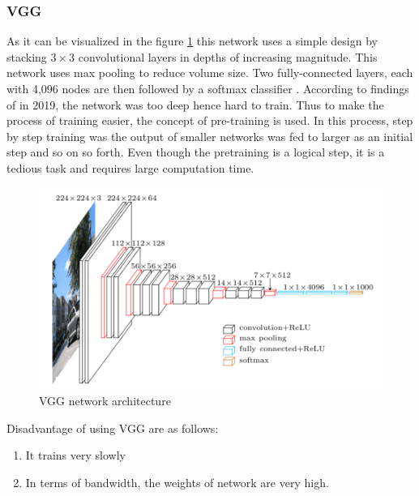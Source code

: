    
    \subsubsection{VGG}
    As it can be visualized in the figure \ref{l05} this network uses a simple design by stacking $3\times3$ convolutional layers in depths of increasing magnitude. This network uses max pooling to reduce volume size. Two fully-connected layers, each with 4,096 nodes are then followed by a softmax classifier \cite{simonyan2014very}. 
    According to findings of \cite{simonyan2014very} in 2019, the network was too deep hence hard to train. Thus to make the process of training easier, the concept of pre-training is used. In this process, step by step training was the output of smaller networks was fed to larger as an initial step and so on so forth. 
    Even though the pretraining is a logical step, it is a tedious task and requires large computation time.
    
     \begin{figure}[h]
     	\centering
     	\includegraphics[width=0.8\linewidth]{images/imagenet_vgg16.png}
     	\caption{VGG network architecture \cite{simonyan2014very}}
     	\label{l05}	
     \end{figure}
    
    Disadvantage of using VGG are as follows:
    \begin{enumerate}
    	\item It trains very slowly
    	\item In terms of bandwidth, the weights of network are very high.
    \end{enumerate}
    
